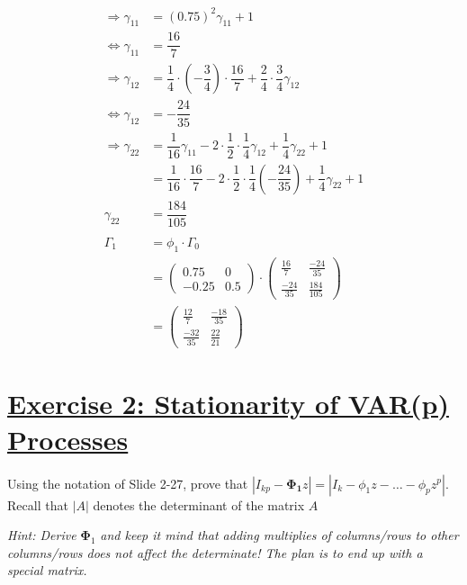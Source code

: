 \documentclass[12pt,a4paper]{article}
\newcommand{\tmpsection}[1]{}
\let\tmpsection=\section
\renewcommand{\section}[1]{\tmpsection{\underline{#1}} }
\begin{document}
\begin{align*}
  \Rightarrow \gamma_{11} & = (0.75)^2 \gamma_{11} + 1\\
  \Leftrightarrow \gamma_{11} & = \dfrac{16}{7}\\
  \Rightarrow \gamma_{12} & = \dfrac{1}{4} \cdot \left( - \dfrac{3}{4} \right) \cdot \dfrac{16}{7} + \dfrac{2}{4} \cdot \dfrac{3}{4} \gamma_{12} \\
  \Leftrightarrow \gamma_{12} & = - \dfrac{24}{35}\\
  \Rightarrow \gamma_{22} & = \dfrac{1}{16} \gamma_{11} - 2 \cdot \dfrac{1}{2} \cdot \dfrac{1}{4} \gamma_{12} + \dfrac{1}{4} \gamma_{22} + 1 \\
  & =  \dfrac{1}{16} \cdot \dfrac{16}{7} - 2 \cdot \dfrac{1}{2} \cdot \dfrac{1}{4} \left(- \dfrac{24}{35} \right) + \dfrac{1}{4} \gamma_{22} + 1\\
  \gamma_{22} & = \dfrac{184}{105}\\
  \\
  \Gamma_1 & = \phi_1 \cdot \Gamma_0\\
  & = 
  \begin{pmatrix} 
  0.75 & 0 \\
  -0.25 & 0.5
  \end{pmatrix}
  \cdot 
  \begin{pmatrix} 
  \frac{16}{7} & \frac{-24}{35}\\
  \frac{-24}{35} & \frac{184}{105}
  \end{pmatrix}\\
  & = 
  \begin{pmatrix} 
  \frac{12}{7} & \frac{-18}{35}\\
  \frac{-32}{35} & \frac{22}{21}
  \end{pmatrix}
\end{align*}

\hypertarget{exercise-2-stationarity-of-varp-processes}{%
\section{Exercise 2: Stationarity of VAR(p)
Processes}\label{exercise-2-stationarity-of-varp-processes}}

Using the notation of Slide 2-27, prove that
\(|I_{kp} - \pmb{\Phi_1} z| = |I_k - \phi_1 z - \ldots - \phi_p z^p|\).
Recall that \(|A|\) denotes the determinant of the matrix \(A\)

\emph{Hint: Derive} \(\pmb{\Phi}_1\) \emph{and keep it mind that adding
multiplies of columns/rows to other columns/rows does not affect the
determinate! The plan is to end up with a special matrix.}
\end{document}
